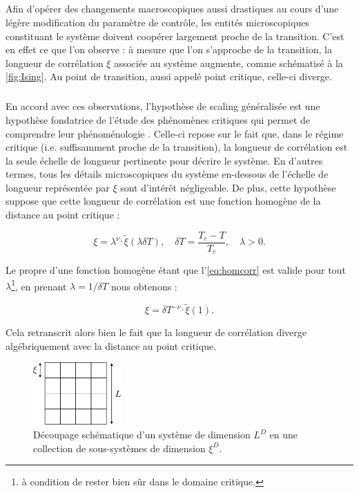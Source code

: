 \subparagraph{}Afin d'opérer des changements macroscopiques aussi drastiques au cours d'une légère modification du paramètre de contrôle, les entités microscopiques constituant le système doivent coopérer largement proche de la transition. C'est en effet ce que l'on observe : à mesure que l'on s'approche de la transition, la longueur de corrélation $\xi$ associée au système augmente, comme schématisé à la \autoref{fig:Ising}. Au point de transition, aussi appelé point critique, celle-ci diverge.

\subparagraph{}En accord avec ces observations, l'hypothèse de scaling généralisée est une hypothèse fondatrice de l'étude des phénomènes critiques qui permet de comprendre leur phénoménologie \cite{kardar_statistical_2007}. Celle-ci repose sur le fait que, dans le régime critique (i.e. suffisamment proche de la transition), la longueur de corrélation est la seule échelle de longueur pertinente pour décrire le système. En d'autres termes, tous les détails microscopiques du système en-dessous de l'échelle de longueur représentée par $\xi$ sont d'intérêt négligeable. De plus, cette hypothèse suppose que cette longueur de corrélation est une fonction homogène de la distance au point critique :

\begin{equation}
    \xi = \lambda^{\nu_\perp} \tilde{\xi}(\lambda \delta T), \quad \delta T = \frac{T_c-T}{T_c}, \quad \lambda>0.
    \label{eq:homcorr}
\end{equation}

\noindent Le propre d'une fonction homogène étant  que l'\autoref{eq:homcorr} est valide pour tout $\lambda$\footnote{à condition de rester bien sûr dans le domaine critique.}, en prenant $\lambda = 1/\delta T$ nous obtenons :

\begin{equation}
    \xi = \delta T^{-\nu_\perp}\tilde{\xi}(1).
\end{equation}

\noindent Cela retranscrit alors bien le fait que la longueur de corrélation diverge algébriquement avec la distance au point critique.

\begin{figure}[h]
	\centering
	\includegraphics[width=0.3\textwidth]{Chapitre1/Figures/PhenomenesCritiques/decoupageXI.pdf}
	\caption{Découpage schématique d'un système de dimension $L^D$ en une collection de sous-systèmes de dimension $\xi^D$.}
	\label{fig:DecoupageXi}
\end{figure}


